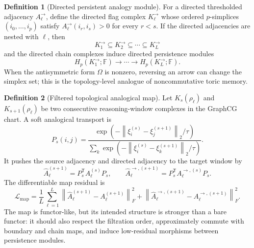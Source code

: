 \documentclass[11pt]{article}
\theoremstyle{definition}
\newtheorem{definition}{Definition}[section]
\theoremstyle{plain}
\theoremstyle{remark}
\numberwithin{equation}{section}
\newcommand{\norm}[1]{\left\lVert #1\right\rVert}
\newcommand{\transpose}{^{\mathsf T}}
\begin{document}
\begin{definition}[Directed persistent analogy module]
For a directed thresholded adjacency $A_\ell^\rightarrow$, define the directed flag complex $K_\ell^\rightarrow$ whose ordered $p$-simplices $(i_0,\ldots,i_p)$ satisfy $A_\ell^\rightarrow(i_r,i_s)>0$ for every $r<s$.  If the directed adjacencies are nested with $\ell$, then
\begin{equation}
  K_1^\rightarrow\subseteq K_2^\rightarrow\subseteq\cdots\subseteq K_L^\rightarrow
\end{equation}
and the directed chain complexes induce directed persistence modules
\begin{equation}
  H_p(K_1^\rightarrow;\mathbb F)\to\cdots\to H_p(K_L^\rightarrow;\mathbb F).
\end{equation}
When the antisymmetric form $\Omega$ is nonzero, reversing an arrow can change the simplex set; this is the topology-level analogue of noncommutative toric memory.
\end{definition}

\begin{definition}[Filtered topological analogical map]
Let $K_s(\rho_\ell)$ and $K_{s+1}(\rho_\ell)$ be two consecutive reasoning-window complexes in the GraphCG chart.  A soft analogical transport is
\begin{equation}
  P_s(i,j)=
  \frac{\exp(-\norm{\xi_i^{(s)}-\xi_j^{(s+1)}}_2/\tau)}
       {\sum_k\exp(-\norm{\xi_i^{(s)}-\xi_k^{(s+1)}}_2/\tau)}.
\end{equation}
It pushes the source adjacency and directed adjacency to the target window by
\begin{equation}
  \widehat A_{\ell}^{(s+1)}=P_s\transpose A_\ell^{(s)}P_s,\qquad
  \widehat A_{\ell}^{\rightarrow,(s+1)}
  =P_s\transpose A_\ell^{\rightarrow,(s)}P_s.
\end{equation}
The differentiable map residual is
\begin{equation}
  \mathcal L_{\mathrm{map}}
  =
  \frac1L\sum_{\ell=1}^L
  \norm{\widehat A_{\ell}^{(s+1)}-A_\ell^{(s+1)}}_F^2
  +\norm{\widehat A_{\ell}^{\rightarrow,(s+1)}
       -A_\ell^{\rightarrow,(s+1)}}_F^2.
\end{equation}
The map is functor-like, but its intended structure is stronger than a bare functor: it should also respect the filtration order, approximately commute with boundary and chain maps, and induce low-residual morphisms between persistence modules.
\end{definition}
\end{document}
